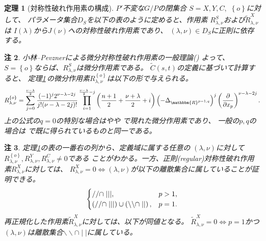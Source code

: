 \documentclass[12pt]{article} %
\newtheorem{theorem}{定理}
\newtheorem{remark}[theorem]{注}
\theoremstyle{definition}
\theoremstyle{exampstyle} \newtheorem{examp}[theorem]{Theorem}
\newcommand{\doubt}[1]{{#1}}
\begin{document}
\newpage
\begin{theorem}[対称性破れ作用素の構成]\label{thm:construction}
	{$P'$不変な$G/P$の閉集合
	$S=X,Y,C,$ $\left\{ o \right\}$に対して、
	パラメータ集合$D_S$を以下の表のように定めると、作用素
	$R_{\lambda,\nu}^S$および$\tilde{R}_{\lambda,\nu}^X$は
	$I(\lambda)$から$J(\nu)$への対称性破れ作用素であり、
$(\lambda,\nu)\in D_S$に正則に依存する}。\\

\vspace{\baselineskip}
\end{theorem}
\begin{remark}
	小林--Pevznerによる微分対称性破れ作用素の一般理論(\cite[Chap.\ 2]{kobayashi2016differential1})
	よって、
	$S=\left\{ o \right\}$ならば、$R_{\lambda,\nu}^S$は微分作用素である。
	$\tilde{C}(s,t)$の定義に基づいて計算すると、
	定理\ref{thm:construction}\,の微分作用素$R_{\lambda,\nu}^{ \left\{ o \right\}}$は以下の形で与えられる。
	\begin{equation*}
		R_{\lambda,\nu}^{ \left\{ o \right\}}=
		\sum_{j=0}^{\frac{\nu-\lambda}{2}}\frac{(-1)^j2^{\nu-\lambda-2j}}{j!(\nu-\lambda-2j)!}\prod_{i=1}^{\frac{\nu-\lambda}{2}-j}\left( \frac{n
		+1}{2}+\frac{\nu+\lambda}{2}
		+i \right)\left(- \Delta_{\mathbbm{R}^{p-1,q}} \right)^j\left( \frac{\partial}{\partial x_p} \right)^{\nu-\lambda-2j}.
	\end{equation*}
	上の公式の$q=0$の特別な場合は\cite[Thms. 5.1.1\doubt{および}5.2.1]{juhl2009families}や\cite[(10.1)]{kobayashi2015symmetry}や\cite[Thm. 6.3]{Kobayashi2016}
	で現れた微分作用素であり、
	一般の$p,q$の場合は
	\cite[Thm.\ 4.3]{kobayashi2015branching}で既に得られているものと同一である。
\end{remark}
\begin{remark}\label{rmk:thm:construction}
	定理\ref{thm:construction}\;の表の一番右の列から、定義域に{属}する任意の
	$(\lambda,\nu)$に対して$R_{\lambda,\nu}^{ \left\{ o \right\}},R_{\lambda,\nu}^Y,R_{\lambda,\nu}^C\neq0$である
	ことがわかる。一方、正則(regular)対称性破れ作用素$R_{\lambda,\nu}^X$に対しては、
	$R^X_{\lambda,\nu}=0\iff(\lambda,\nu)$が以下の離散集合に属していることが証明できる。
	\[\begin{cases}
			//\cap\mid\mid\mid,&p>1,\\
			\left(//\cap\mid\mid\mid\right) \cup \left(\backslash\backslash\cap\mid\mid\right),&p=1.
		\end{cases}
	\]
	再正規化した作用素$\tilde{R}_{\lambda,\nu}^X$に対しては{、}以下が同値となる。
	$\tilde{R}_{\lambda,\nu}^X=0\iff p=1$かつ$(\lambda,\nu)$は離散集合$\backslash\backslash\cap \mid\mid$に属している。
\end{remark}
\end{document}
